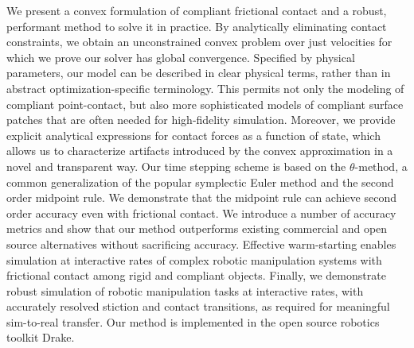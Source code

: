
We present a convex formulation of compliant frictional contact and a robust, 
performant method to solve it in practice. By analytically eliminating contact
constraints, we obtain an unconstrained convex problem over just velocities
for which we prove our solver has global convergence. Specified by physical parameters, our model can be described in clear
physical terms, rather than in abstract optimization-specific terminology. This permits not only the modeling of compliant point-contact, but also more sophisticated models of compliant surface patches 
that are often needed for high-fidelity simulation. 
Moreover, we provide explicit analytical
expressions for contact forces as a function of state, which allows us to
characterize artifacts introduced by the convex approximation in a novel and
transparent way.
Our time stepping scheme
is based on the $\theta\text{-method}$, a common generalization
of the popular symplectic Euler method and the second order
midpoint rule. We demonstrate that the midpoint rule can achieve second order
accuracy even with frictional contact. We introduce a number of accuracy metrics
and show that our method outperforms existing commercial and open source
alternatives without sacrificing accuracy.
Effective warm-starting
enables simulation at interactive rates of complex robotic manipulation systems
with frictional contact among rigid and compliant objects. 
Finally, we demonstrate robust
simulation of robotic manipulation tasks at interactive rates, with accurately
resolved stiction and contact transitions, as required for meaningful
sim-to-real transfer. Our method is implemented in the open source robotics
toolkit Drake.
